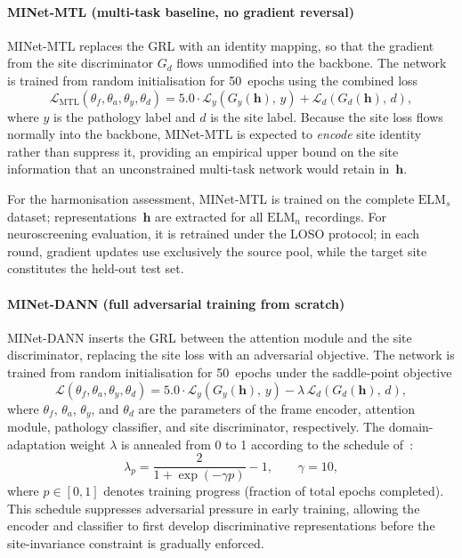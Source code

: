 \documentclass[preprint,12pt]{elsarticle}
\begin{document}
\paragraph{MINet-MTL (multi-task baseline, no gradient reversal)}
MINet-MTL replaces the GRL with an identity mapping, so that the
gradient from the site discriminator $G_d$ flows unmodified into the
backbone.
The network is trained from random initialisation for 50~epochs using
the combined loss
\begin{equation}
    \mathcal{L}_{\mathrm{MTL}}(\theta_f, \theta_a, \theta_y, \theta_d )
        = 5.0 \cdot \mathcal{L}_y\!\left(G_y(\mathbf{h}),\,y\right)
          + \mathcal{L}_d\!\left(G_d(\mathbf{h}),\,d\right),
\end{equation}
where $y$ is the pathology label and $d$ is the site label.
Because the site loss flows normally into the backbone, MINet-MTL is
expected to \emph{encode} site identity rather than suppress it,
providing an empirical upper bound on the site information that an
unconstrained multi-task network would retain in~$\mathbf{h}$.

For the harmonisation assessment, MINet-MTL is trained on the
complete $\mathrm{ELM}_s$ dataset; representations~$\mathbf{h}$ are
extracted for all $\mathrm{ELM}_n$ recordings.
For neuroscreening evaluation, it is retrained under the LOSO
protocol; in each round, gradient updates use exclusively the source
pool, while the target site constitutes the held-out test set.

\paragraph{MINet-DANN (full adversarial training from scratch)}
MINet-DANN inserts the GRL between the attention module and the site
discriminator, replacing the site loss with an adversarial objective.
The network is trained from random initialisation for 50~epochs under
the saddle-point objective
\begin{equation}
    \mathcal{L}(\theta_f,\theta_a,\theta_y,\theta_d)
        = 5.0 \cdot \mathcal{L}_y\!\left(G_y(\mathbf{h}),\,y\right)
          - \lambda\,\mathcal{L}_d\!\left(G_d(\mathbf{h}),\,d\right),
\end{equation}
where $\theta_f$, $\theta_a$, $\theta_y$, and $\theta_d$ are the
parameters of the frame encoder, attention module, pathology
classifier, and site discriminator, respectively.
The domain-adaptation weight $\lambda$ is annealed from 0 to 1
according to the schedule of~\cite{ganin2016domain}:
\begin{equation}
    \lambda_p = \frac{2}{1+\exp(-\gamma p)} - 1, \qquad \gamma = 10,
    \label{eq:lambda_schedule}
\end{equation}
where $p \in [0,1]$ denotes training progress (fraction of total
epochs completed).
This schedule suppresses adversarial pressure in early training,
allowing the encoder and classifier to first develop discriminative
representations before the site-invariance constraint is gradually
enforced.
\end{document}
